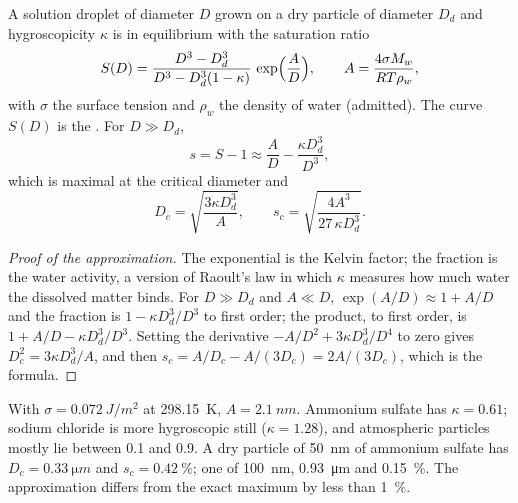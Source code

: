 \begin{proposition}\label{prop:b2:atmospheric-thermodynamics:kohler}
A solution droplet of diameter $D$ grown on a dry particle of diameter $D_d$ and hygroscopicity
$\kappa$ is in equilibrium with the saturation ratio
\[
  S(D) = \frac{D^3 - D_d^3}{D^3 - D_d^3(1 - \kappa)}\,\exp\Bigl(\frac{A}{D}\Bigr), \qquad
  A = \frac{4\sigma M_w}{R T\rho_w},
\]
with $\sigma$ the surface tension and $\rho_w$ the density of water (admitted). The curve $S(D)$
is the \emph{}. For $D \gg D_d$,
\[
  s = S - 1 \approx \frac{A}{D} - \frac{\kappa D_d^3}{D^3},
\]
which is maximal at the critical diameter and 
\[
  D_c = \sqrt{\frac{3\kappa D_d^3}{A}}, \qquad s_c = \sqrt{\frac{4A^3}{27\,\kappa D_d^3}} .
\]
\end{proposition}

\begin{proof}[Proof of the approximation]
The exponential is the Kelvin factor; the fraction is the water activity, a version of Raoult's
law in which $\kappa$ measures how much water the dissolved matter binds. For $D \gg D_d$ and
$A \ll D$, $\exp(A/D) \approx 1 + A/D$ and the fraction is $1 - \kappa D_d^3/D^3$ to first
order; the product, to first order, is $1 + A/D - \kappa D_d^3/D^3$. Setting the derivative
$-A/D^2 + 3\kappa D_d^3/D^4$ to zero gives $D_c^2 = 3\kappa D_d^3/A$, and then $s_c = A/D_c -
A/(3D_c) = 2A/(3D_c)$, which is the formula.
\end{proof}

With $\sigma = \qty{0.072}{J/m^2}$ at \qty{298.15}{K}, $A = \qty{2.1}{nm}$. Ammonium sulfate has
$\kappa = 0.61$; sodium chloride is more hygroscopic still ($\kappa = 1.28$), and atmospheric particles mostly lie between 0.1 and 0.9.
A dry particle of \qty{50}{nm} of ammonium sulfate has $D_c = \qty{0.33}{\micro m}$ and $s_c =
\qty{0.42}{\percent}$; one of \qty{100}{nm}, \qty{0.93}{\micro m} and \qty{0.15}{\percent}. The
approximation differs from the exact maximum by less than \qty{1}{\percent}.


